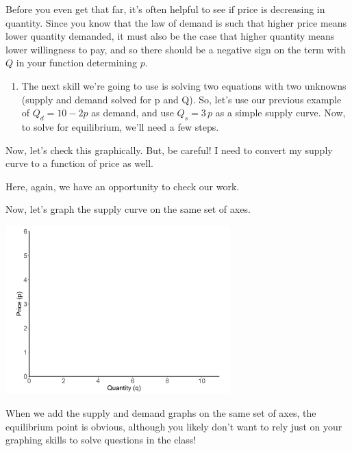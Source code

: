 \documentclass[11pt,]{article}
\providecommand{\tightlist}{%
  \setlength{\itemsep}{0pt}\setlength{\parskip}{0pt}}
\begin{document}
Before you even get that far, it's often helpful to see if price is
decreasing in quantity. Since you know that the law of demand is such
that higher price means lower quantity demanded, it must also be the
case that higher quantity means lower willingness to pay, and so there
should be a negative sign on the term with \(Q\) in your function
determining \(p\).

\begin{enumerate}
\def\labelenumi{\arabic{enumi}.}
\setcounter{enumi}{1}
\tightlist
\item
  The next skill we're going to use is solving two equations with two
  unknowns (supply and demand solved for p and Q). So, let's use our
  previous example of \(Q_d=10-2p\) as demand, and use \(Q_s=3\,p\) as a
  simple supply curve. Now, to solve for equilibrium, we'll need a few
  steps.
\end{enumerate}

\vspace{10cm}

Now, let's check this graphically. But, be careful! I need to convert my
supply curve to a function of price as well.

Here, again, we have an opportunity to check our work.

\vspace{10cm}

Now, let's graph the supply curve on the same set of axes.

\begin{center}
\includegraphics[width=0.65\textwidth]{../images/eq_blank.png}
\end{center}

When we add the supply and demand graphs on the same set of axes, the
equilibrium point is obvious, although you likely don't want to rely
just on your graphing skills to solve questions in the class!
\end{document}
